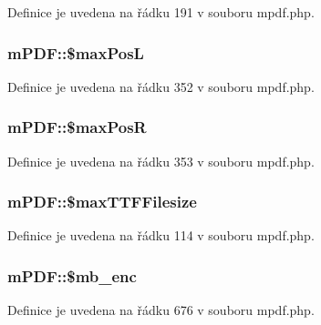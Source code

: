 Definice je uvedena na řádku 191 v souboru mpdf.\-php.

\hypertarget{classm_p_d_f_ad005203af912cab3457f038c57275ea1}{
\subsubsection[{\$max\-Pos\-L}]{\setlength{\rightskip}{0pt plus 5cm}m\-P\-D\-F\-::\$max\-Pos\-L}}\label{classm_p_d_f_ad005203af912cab3457f038c57275ea1}


Definice je uvedena na řádku 352 v souboru mpdf.\-php.

\hypertarget{classm_p_d_f_a8ef3950f5776ff51e329692396aa410c}{
\subsubsection[{\$max\-Pos\-R}]{\setlength{\rightskip}{0pt plus 5cm}m\-P\-D\-F\-::\$max\-Pos\-R}}\label{classm_p_d_f_a8ef3950f5776ff51e329692396aa410c}


Definice je uvedena na řádku 353 v souboru mpdf.\-php.

\hypertarget{classm_p_d_f_a465cffc2d3c2dbbbdfed4b312afeb30d}{
\subsubsection[{\$max\-T\-T\-F\-Filesize}]{\setlength{\rightskip}{0pt plus 5cm}m\-P\-D\-F\-::\$max\-T\-T\-F\-Filesize}}\label{classm_p_d_f_a465cffc2d3c2dbbbdfed4b312afeb30d}


Definice je uvedena na řádku 114 v souboru mpdf.\-php.

\hypertarget{classm_p_d_f_a23d00464ed9c6b2c926bb82373e60a9a}{
\subsubsection[{\$mb\-\_\-enc}]{\setlength{\rightskip}{0pt plus 5cm}m\-P\-D\-F\-::\$mb\-\_\-enc}}\label{classm_p_d_f_a23d00464ed9c6b2c926bb82373e60a9a}


Definice je uvedena na řádku 676 v souboru mpdf.\-php.



